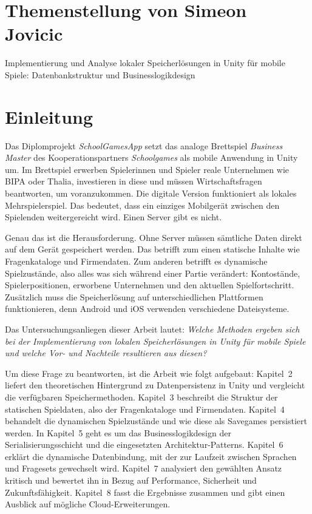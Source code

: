 \documentclass[12pt,a4paper]{article}
\begin{document}

\section*{Themenstellung von Simeon Jovicic}

Implementierung und Analyse lokaler Speicherlösungen in Unity für mobile Spiele: Datenbankstruktur und Businesslogikdesign

\section{Einleitung}

Das Diplomprojekt \textit{SchoolGamesApp} setzt das analoge Brettspiel \textit{Business Master} des Kooperationspartners \textit{Schoolgames} als mobile Anwendung in Unity um. Im Brettspiel erwerben Spielerinnen und Spieler reale Unternehmen wie BIPA oder Thalia, investieren in diese und müssen Wirtschaftsfragen beantworten, um voranzukommen. Die digitale Version funktioniert als lokales Mehrspielerspiel. Das bedeutet, dass ein einziges Mobilgerät zwischen den Spielenden weitergereicht wird. Einen Server gibt es nicht.

Genau das ist die Herausforderung. Ohne Server müssen sämtliche Daten direkt auf dem Gerät gespeichert werden. Das betrifft zum einen statische Inhalte wie Fragenkataloge und Firmendaten. Zum anderen betrifft es dynamische Spielzustände, also alles was sich während einer Partie verändert: Kontostände, Spielerpositionen, erworbene Unternehmen und den aktuellen Spielfortschritt. Zusätzlich muss die Speicherlösung auf unterschiedlichen Plattformen funktionieren, denn Android und iOS verwenden verschiedene Dateisysteme.

Das Untersuchungsanliegen dieser Arbeit lautet: \textit{Welche Methoden ergeben sich bei der Implementierung von lokalen Speicherlösungen in Unity für mobile Spiele und welche Vor- und Nachteile resultieren aus diesen?}

Um diese Frage zu beantworten, ist die Arbeit wie folgt aufgebaut: Kapitel~2 liefert den theoretischen Hintergrund zu Datenpersistenz in Unity und vergleicht die verfügbaren Speichermethoden. Kapitel~3 beschreibt die Struktur der statischen Spieldaten, also der Fragenkataloge und Firmendaten. Kapitel~4 behandelt die dynamischen Spielzustände und wie diese als Savegames persistiert werden. In Kapitel~5 geht es um das Businesslogikdesign der Serialisierungsschicht und die eingesetzten Architektur-Patterns. Kapitel~6 erklärt die dynamische Datenbindung, mit der zur Laufzeit zwischen Sprachen und Fragesets gewechselt wird. Kapitel~7 analysiert den gewählten Ansatz kritisch und bewertet ihn in Bezug auf Performance, Sicherheit und Zukunftsfähigkeit. Kapitel~8 fasst die Ergebnisse zusammen und gibt einen Ausblick auf mögliche Cloud-Erweiterungen.
\end{document}
